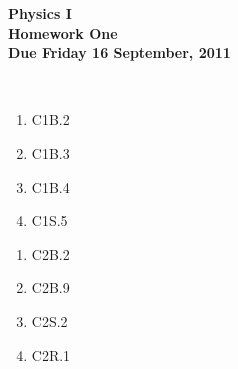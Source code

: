 \documentclass[12pt]{article}
\begin{document}
\pagestyle{empty}
 
\begin{center}
{\large {\bf Physics I}}\\
\medskip
{\large {\bf Homework One}}\\
\medskip
{ {\bf Due Friday 16 September, 2011}}\\
\end{center}

\hspace{2mm}\\


\begin{enumerate}
\setlength{\itemsep}{-1mm}
  \item C1B.2
  \item C1B.3
  \item C1B.4
  \item C1S.5

\end{enumerate}



\begin{enumerate}
\setlength{\itemsep}{-1mm}
  \item C2B.2
  \item C2B.9
  \item C2S.2
  \item C2R.1

\end{enumerate}
\end{document}
